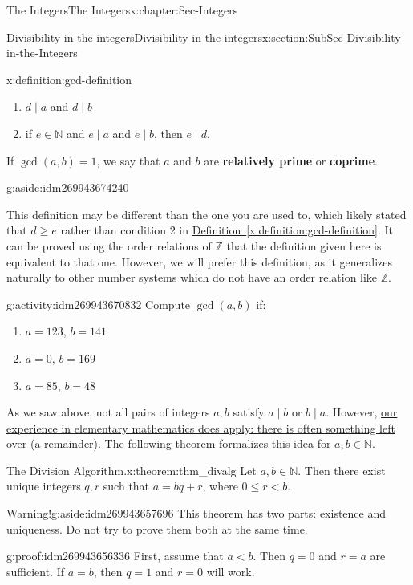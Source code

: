 \documentclass[oneside,10pt,]{book}
\newcommand{\terminology}[1]{\textbf{#1}}
\numberwithin{equation}{section}
\renewcommand{\le}{\leqslant}
\renewcommand{\ge}{\geqslant}
\def\Z{{\mathbb Z}}
\def\N{{\mathbb N}}
\newcommand{\lt}{<}
\begin{document}
\begin{chapterptx}{The Integers}{}{The Integers}{}{}{x:chapter:Sec-Integers}
\begin{sectionptx}{Divisibility in the integers}{}{Divisibility in the integers}{}{}{x:section:SubSec-Divisibility-in-the-Integers}
\begin{definition}{}{x:definition:gcd-definition}
\begin{enumerate}
\item{}\(d\mid a\) and \(d\mid b\)%
\item{}if \(e\in \N\) and \(e\mid a\) and \(e\mid b\), then \(e\mid d\).%
\end{enumerate}
%
\par
If \(\gcd(a,b) = 1\), we say that \(a\) and \(b\) are \terminology{relatively prime} or \terminology{coprime}. \begin{aside}{}{g:aside:idm269943674240}%
\end{aside}
%
\end{definition}
This definition may be different than the one you are used to, which likely stated that \(d \ge e\) rather than condition 2 in \hyperref[x:definition:gcd-definition]{Definition~\ref{x:definition:gcd-definition}}. It can be proved using the order relations of \(\Z\) that the definition given here is equivalent to that one. However, we will prefer this definition, as it generalizes naturally to other number systems which do not have an order relation like \(\Z\).%
\begin{activity}{}{g:activity:idm269943670832}%
Compute \(\gcd(a,b)\) if:%
\begin{enumerate}
\item{}\(a = 123\), \(b = 141\)%
\item{}\(a = 0\), \(b = 169\)%
\item{}\(a= 85\), \(b = 48\)%
\end{enumerate}
%
\end{activity}
As we saw above, not all pairs of integers \(a,b\) satisfy \(a\mid b\) or \(b\mid a\). However, \href{http://www.corestandards.org/Math/Content/4/NBT/B/6/}{our experience in elementary mathematics does apply: there is often something left over (a remainder)}. The following theorem formalizes this idea for \(a,b\in \N\).%
\begin{theorem}{The Division Algorithm.}{}{x:theorem:thm_divalg}%
Let \(a,b\in \N\). Then there exist unique integers \(q,r\) such that \(a = bq + r\), where \(0 \le r \lt b\).%
\end{theorem}
\begin{aside}{Warning!}{g:aside:idm269943657696}%
This theorem has two parts: existence and uniqueness. Do not try to prove them both at the same time.%
\end{aside}
\begin{proofptx}{}{g:proof:idm269943656336}
First, assume that \(a \lt b\). Then \(q = 0\) and \(r = a\) are sufficient. If \(a = b\), then \(q = 1\) and \(r = 0\) will work.%

\end{proofptx}
\end{sectionptx}
\end{chapterptx}
\end{document}

